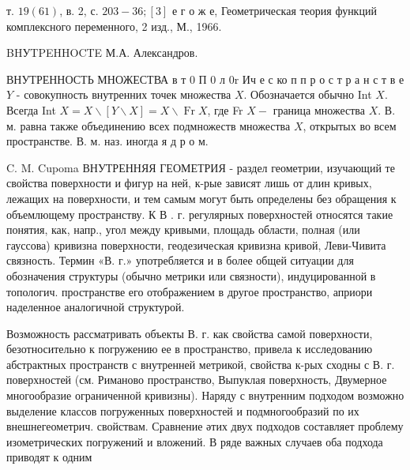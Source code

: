 \documentclass[10pt]{article}
\begin{document}
т. $19(61)$, в. 2, с. $203-36 ;[3]$ е г о ж е, Геометрическая теория функций комплексного переменного, 2 изд., М., 1966.



BHУTPEHHOCTE М.А. Александров.



ВНУТРЕННОСТЬ МНОЖЕСТВА в т 0 П 0 л $0 \mathrm{r}$ Ич е с ко п п р о с т р а н с т в е $Y$ - совокупность внутренних точек множества $X$. Обозначается обычно Int $X$. Всегда Int $X=X \backslash[Y \backslash X]=X \backslash \operatorname{Fr} X$, где Fr $X-$ граница множества $X$. В. м. равна также объединению всех подмножеств множества $X$, открытых во всем пространстве. В. м. наз. иногда я д р о м.



C. M. Cupoma ВНУТРЕННЯЯ ГЕОМЕТРИЯ - раздел геометрии, изучающий те свойства поверхности и фигур на ней, к-рые зависят лишь от длин кривых, лежащих на поверхности, и тем самым могут быть определены без обращения к объемлющему пространству. К В . г. регулярных поверхностей относятся такие понятия, как, напр., угол между кривыми, площадь области, полная (или гауссова) кривизна поверхности, геодезическая кривизна кривой, Леви-Чивита связность. Термин «В. г.» употребляется и в более общей ситуации для обозначения структуры (обычно метрики или связности), индуцированной в топологич. пространстве его отображением в другое пространство, априори наделенное аналогичной структурой.



Возможность рассматривать объекты В. г. как свойства самой поверхности, безотносительно к погружению ее в пространство, привела к исследованию абстрактных пространств с внутренней метрикой, свойства к-рых сходны с В. г. поверхностей (см. Риманово пространство, Выпуклая поверхность, Двумерное многообразие ограниченной кривизны). Наряду с внутренним подходом возможно выделение классов погруженных поверхностей и подмногообразий по их внешнегеометрич. свойствам. Сравнение әтих двух подходов составляет проблему изометрических погружений и вложений. В ряде важных случаев оба подхода приводят к одним
\end{document}
